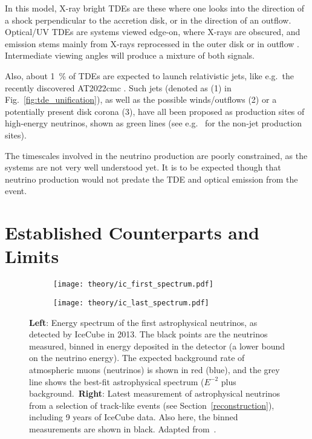 In this model, X-ray bright TDEs are these where one looks into the direction of a shock perpendicular to the accretion disk, or in the direction of an outflow. Optical/UV TDEs are systems viewed edge-on, where X-rays are obscured, and emission stems mainly from X-rays reprocessed in the outer disk or in outflow . Intermediate viewing angles will produce a mixture of both signals.

Also, about \SI{1}{\percent} of TDEs are expected to launch relativistic jets, like e.g.\ the recently discovered AT2022cmc . Such jets (denoted as (1) in Fig.~\ref{fig:tde_unification}), as well as the possible winds/outflows (2) or a potentially present disk corona (3), have all been proposed as production sites of high-energy neutrinos, shown as green lines (see e.g.\  for the non-jet production sites).

The timescales involved in the neutrino production are poorly constrained, as the systems are not very well understood yet. It is to be expected though that neutrino production would not predate the TDE and optical emission from the event.

\section{Established Counterparts and Limits}

\begin{figure}[htb]
    \centering
    \begin{subfigure}[b]{0.52\textwidth}
        \centering
        \texttt{[image: theory/ic\_first\_spectrum.pdf]}
    \end{subfigure}
    \begin{subfigure}[b]{0.47\textwidth}
        \centering
        \texttt{[image: theory/ic\_last\_spectrum.pdf]}
    \end{subfigure}
    \caption[Astrophysical neutrino spectrum]{\textbf{Left}: Energy spectrum of the first astrophysical neutrinos, as detected by IceCube in 2013. The black points are the neutrinos measured, binned in energy deposited in the detector (a lower bound on the neutrino energy). The expected background rate of atmospheric muons (neutrinos) is shown in red (blue), and the grey line shows the best-fit astrophysical spectrum ($E^{-2}$ plus background.\ \textbf{Right}: Latest measurement of astrophysical neutrinos from a selection of track-like events (see Section~\ref{reconstruction}), including 9 years of IceCube data. Also here, the binned measurements are shown in black. Adapted from~\cite{Aartsen2013,Abbasi2022b}.}
\end{figure}

